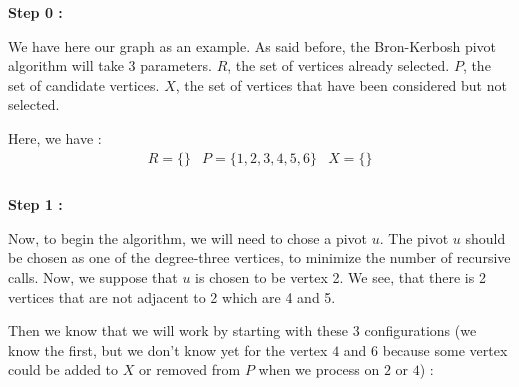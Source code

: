     \hspace*{1cm} \textbf{Step 0 :}
    \\
    \begin{minipage}{0.4\textwidth}
    \end{minipage}
    \begin{minipage}{0.6\textwidth}
        We have here our graph as an example. As said before, the Bron-Kerbosh pivot algorithm will take 3 parameters. $R$, the set of vertices already selected. $P$, the set of candidate vertices. $X$, the set of vertices that have been considered but not selected.
    \end{minipage}
    Here, we have :
    $$ \boxed{
            \begin{array}{lll}
                R = \{\} & P = \{1,2,3,4,5,6\} & X = \{\} \\
            \end{array}
    }$$
    \\ 
    \hspace*{1cm}  \textbf{Step 1 :}
    \\
    \begin{minipage}{0.4\textwidth}
    \end{minipage}
    \begin{minipage}{0.6\textwidth}
        Now, to begin the algorithm, we will need to chose a pivot $u$. The pivot $u$ should be chosen as one of the degree-three vertices, to minimize the number of recursive calls. Now, we suppose that $u$ is chosen to be vertex 2. We see, that there is 2 vertices that are not adjacent to 2 which are 4 and 5.
    \end{minipage}
    Then we know that we will work by starting with these 3 configurations (we know the first, but we don't know yet for the vertex $4$ and $6$ because some vertex could be added to $X$ or removed from $P$ when we process on $2$ or $4$) :
